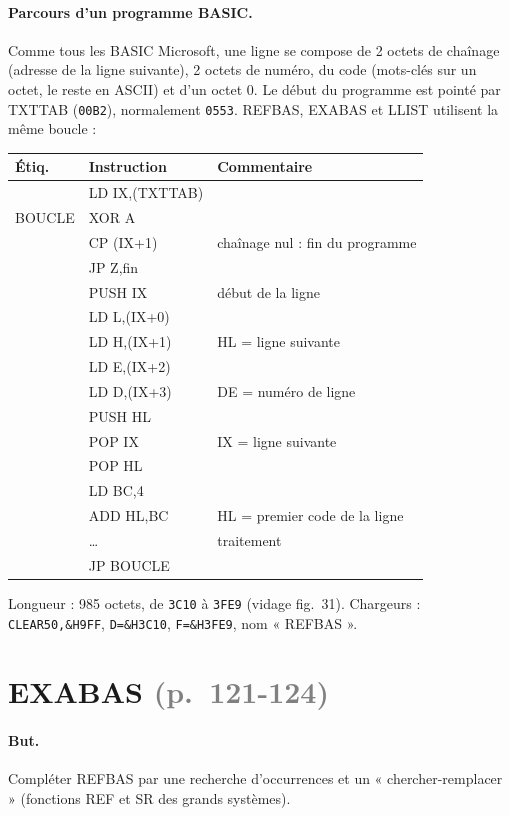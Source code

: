\documentclass[a4paper,10pt]{article}
\makeatletter
\newcommand{\hex}[1]{\texttt{#1}}
\newcommand{\pg}[1]{\texorpdfstring{\textcolor{gray}{\small(p.~#1)}}{}}
\newenvironment{src}
  {\small\begin{longtable}{@{}>{\ttfamily}l>{\ttfamily}l>{\raggedright\arraybackslash}p{8.6cm}@{}}
   \toprule
   \normalfont\bfseries Étiq. & \normalfont\bfseries Instruction & \textbf{Commentaire}\\
   \midrule\endhead
   \bottomrule\endfoot}
  {\end{longtable}}
\makeatother
\begin{document}
\paragraph{Parcours d'un programme BASIC.} Comme tous les BASIC Microsoft,
une ligne se compose de 2 octets de chaînage (adresse de la ligne suivante),
2 octets de numéro, du code (mots-clés sur un octet, le reste en ASCII) et
d'un octet 0. Le début du programme est pointé par TXTTAB (\hex{00B2}),
normalement \hex{0553}. REFBAS, EXABAS et LLIST utilisent la même boucle :
\begin{src}
 & LD IX,(TXTTAB) & \\
BOUCLE & XOR A & \\
 & CP (IX+1) & chaînage nul : fin du programme \\
 & JP Z,fin & \\
 & PUSH IX & début de la ligne \\
 & LD L,(IX+0) & \\
 & LD H,(IX+1) & HL = ligne suivante \\
 & LD E,(IX+2) & \\
 & LD D,(IX+3) & DE = numéro de ligne \\
 & PUSH HL & \\
 & POP IX & IX = ligne suivante \\
 & POP HL & \\
 & LD BC,4 & \\
 & ADD HL,BC & HL = premier code de la ligne \\
 & \dots & traitement \\
 & JP BOUCLE & \\
\end{src}
Longueur : 985 octets, de \hex{3C10} à \hex{3FE9} (vidage fig.~31).
Chargeurs : \texttt{CLEAR50,\&H9FF}, \texttt{D=\&H3C10}, \texttt{F=\&H3FE9},
nom « REFBAS ».

\section{EXABAS \pg{121-124}}

\paragraph{But.} Compléter REFBAS par une recherche d'occurrences et un
« chercher-remplacer » (fonctions REF et SR des grands systèmes).
\end{document}
